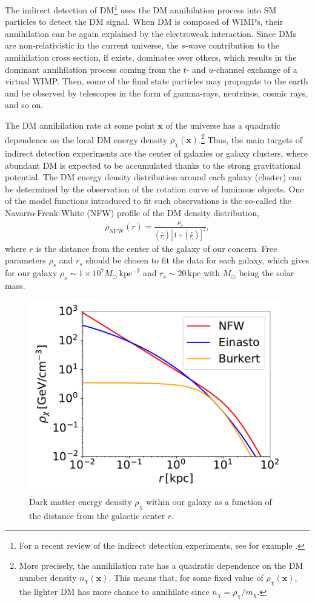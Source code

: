 \documentclass[12pt,twoside,book]{article}
\begin{document}
The indirect detection of DM\footnote{
  For a recent review of the indirect detection experiments, see for example \cite{Gaskins:2016cha}.
}
uses the DM annihilation process into SM particles to detect the DM signal.
When DM is composed of WIMPs, their annihilation can be again explained by the electroweak interaction.
Since DMs are non-relativistic in the current universe, the $s$-wave contribution to the annihilation cross section, if exists, dominates over others, which results in the dominant annihilation process coming from the $t$- and $u$-channel exchange of a virtual WIMP.
Then, some of the final state particles may propagate to the earth and be observed by telescopes in the form of gamma-rays, neutrinos, cosmic rays, and so on.

The DM annihilation rate at some point $\bm{x}$ of the universe has a quadratic dependence on the local DM energy density $\rho_\chi (\bm{x})$.\footnote{
  More precisely, the annihilation rate has a quadratic dependence on the DM number density $n_\chi (\bm{x})$.
  This means that, for some fixed value of $\rho_\chi (\bm{x})$, the lighter DM has more chance to annihilate since $n_\chi = \rho_\chi / m_\chi$.
}
Thus, the main targets of indirect detection experiments are the center of galaxies or galaxy clusters, where abundant DM is expected to be accumulated thanks to the strong gravitational potential.
The DM energy density distribution around each galaxy (cluster) can be determined by the observation of the rotation curve of luminous objects.
One of the model functions introduced to fit such observations is the so-called the Navarro-Frenk-White (NFW) profile \cite{Navarro:1995iw, Navarro:1996gj} of the DM density distribution,
\begin{align}
  \rho_{\mathrm{NFW}} (r) = \frac{\rho_s}
  { \left( \frac{r}{r_s} \right) \left[ 1 + \left( \frac{r}{r_s} \right) \right]^2},
\end{align}
where $r$ is the distance from the center of the galaxy of our concern.
Free parameters $\rho_s$ and $r_s$ should be chosen to fit the data for each galaxy, which gives for our galaxy $\rho_s \sim 1\times 10^7 M_\odot\, \mathrm{kpc}^{-3}$ and $r_s \sim 20\,\mathrm{kpc}$ \cite{Fornasa:2013iaa} with $M_\odot$ being the solar mass.

\begin{figure}
  \centering
  \includegraphics[width=0.5\hsize]{profile.pdf}
  \caption{
    Dark matter energy density $\rho_\chi$ within our galaxy as a function of the distance from the galactic center $r$.
  }
  \label{fig:profile}
\end{figure}
\end{document}
